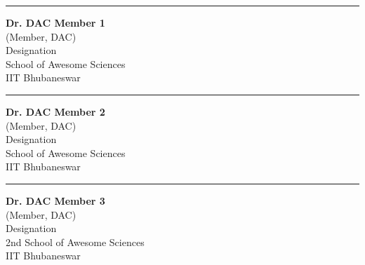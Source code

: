 \vspace*{1em}
\begin{center}
    \begin{minipage}[t]{0.31\textwidth}
    \begin{flushleft}
        \hrule\vspace{2ex}
        {\small {\bfseries Dr. DAC Member 1}\\
        (Member, DAC)\\
        Designation\\
        School of Awesome Sciences\\
        IIT Bhubaneswar}
    \end{flushleft}
    \end{minipage}
    \hfill
    \begin{minipage}[t]{0.31\textwidth}
    \begin{center}
        \hrule\vspace{2ex}
        {\small {\bfseries Dr. DAC Member 2}\\
        (Member, DAC)\\
        Designation\\
        School of Awesome Sciences\\
        IIT Bhubaneswar}
    \end{center}
    \end{minipage}
    \hfill
    \begin{minipage}[t]{0.31\textwidth}
    \begin{flushright}
        \hrule\vspace{2ex}
        {\small {\bfseries Dr. DAC Member 3}\\
        (Member, DAC)\\
        Designation\\
        2nd School of Awesome Sciences\\
        IIT Bhubaneswar}
    \end{flushright}
    \end{minipage}
\end{center}

